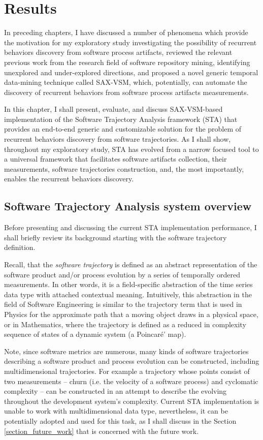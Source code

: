 \chapter{Results}\label{chapter_sta}
In preceding chapters, I have discussed a number of phenomena which provide the motivation for my exploratory study investigating the possibility of recurrent behaviors discovery from software process artifacts, reviewed the relevant previous work from the research field of software repository mining, identifying unexplored and under-explored directions, and proposed a novel generic temporal data-mining technique called \mbox{SAX-VSM}, which, potentially, can automate the discovery of recurrent behaviors from software process artifacts measurements.

In this chapter, I shall present, evaluate, and discuss \mbox{SAX-VSM}-based implementation of the Software Trajectory Analysis framework (STA) that provides an end-to-end generic and customizable solution for the problem of recurrent behaviors discovery from software trajectories.  As I shall show, throughout my exploratory study, STA has evolved from a narrow focused tool to a universal framework that facilitates software artifacts collection, their measurements, software trajectories construction, and, the most importantly, enables the recurrent behaviors discovery.

\section{Software Trajectory Analysis system overview}\label{section_sta_overview}
Before presenting and discussing the current STA implementation performance, I shall briefly review its background starting with the software trajectory definition. 

Recall, that the \textit{software trajectory} is defined as an abstract representation of the software product and/or process evolution by a series of temporally ordered measurements. In other words, it is a field-specific abstraction of the time series data type with attached contextual meaning. Intuitively, this abstraction in the field of Software Engineering is similar to the trajectory term that is used in Physics for the approximate path that a moving object draws in a physical space, or in Mathematics, where the trajectory is defined as a reduced in complexity sequence of states of a dynamic system (a Poincar\'{e}' map).

Note, since software metrics are numerous, many kinds of software trajectories describing a software product and process evolution can be constructed, including multidimensional trajectories. For example a trajectory whose points consist of two measurements -- churn (i.e. the velocity of a software process) and cyclomatic complexity -- can be constructed in an attempt to describe the evolving throughout the development system's complexity. Current STA implementation is unable to work with multidimensional data type, nevertheless, it can be potentially adopted and used for this task, as I shall discuss in the Section \ref{section_future_work} that is concerned with the future work.

